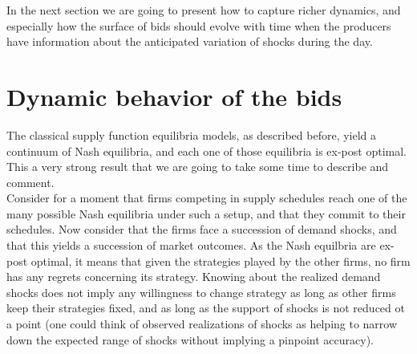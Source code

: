 %

In the next section we are going to present how to capture richer dynamics, and especially how the surface of bids should evolve with time when the producers have information about the anticipated variation of shocks during the day. 

\section{Dynamic behavior of the bids} \label{dynamics}
The classical supply function equilibria models, as described before, yield a continuum of Nash equilibria, and each one of those equilibria is ex-post optimal. This a very strong result that we are going to take some time to describe and comment.\\

Consider for a moment that firms competing in supply schedules reach one of the many possible Nash equilibria under such a setup, and that they commit to their schedules. Now consider that the firms face a succession of demand shocks, and that this yields a succession of market outcomes. As the Nash equilbria are ex-post optimal, it means that given the strategies played by the other firms, no firm has any regrets concerning its strategy. Knowing about the realized demand shocks does not imply any willingness to change strategy as long as other firms keep their strategies fixed, and as long as the support of shocks is not reduced ot a point (one could think of observed realizations of shocks as helping to narrow down the expected range of shocks without implying a pinpoint accuracy).\\


